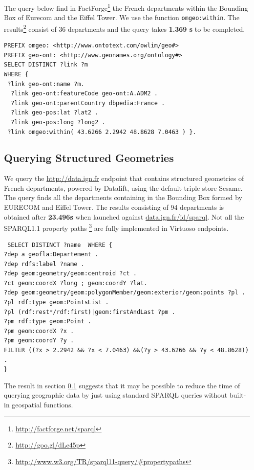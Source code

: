 The query below find in FactForge\footnote{\url{http://factforge.net/sparql}} the French departments within the Bounding Box of Eurecom and the Eiffel Tower. We use the function \texttt{omgeo:within}. The results\footnote{\url{http://goo.gl/dLc45p}} consist of 36 departments and the query takes \textbf{1.369 s} to be completed.
\begin{verbatim}
PREFIX omgeo: <http://www.ontotext.com/owlim/geo#>
PREFIX geo-ont: <http://www.geonames.org/ontology#>
SELECT DISTINCT ?link ?m
WHERE {
 ?link geo-ont:name ?m.
  ?link geo-ont:featureCode geo-ont:A.ADM2 .
  ?link geo-ont:parentCountry dbpedia:France .
  ?link geo-pos:lat ?lat2 .
  ?link geo-pos:long ?long2 .
 ?link omgeo:within( 43.6266 2.2942 48.8628 7.0463 ) }.

\end{verbatim}


\subsection{Querying Structured Geometries}
\label{sec:ignsparql}
 We query the \url{http://data.ign.fr} endpoint that contains structured geometries of French departments, powered by Datalift, using the default triple store Sesame. The query finds all the departments containing in the Bounding Box formed by EURECOM and Eiffel Tower. The results consisting of 94 departments is obtained after \textbf{23.496s} when launched against \url{data.ign.fr/id/sparql}. Not all the SPARQL1.1 property paths \footnote{\url{http://www.w3.org/TR/sparql11-query/\#propertypaths}} are fully implemented in Virtuoso endpoints.


 \begin{verbatim}
 SELECT DISTINCT ?name  WHERE {
?dep a geofla:Departement .
?dep rdfs:label ?name .
?dep geom:geometry/geom:centroid ?ct .
?ct geom:coordX ?long ; geom:coordY ?lat.
?dep geom:geometry/geom:polygonMember/geom:exterior/geom:points ?pl .
?pl rdf:type geom:PointsList .
?pl (rdf:rest*/rdf:first)|geom:firstAndLast ?pm .
?pm rdf:type geom:Point .
?pm geom:coordX ?x .
?pm geom:coordY ?y .
FILTER ((?x > 2.2942 && ?x < 7.0463) &&(?y > 43.6266 && ?y < 48.8628)) .
}
 \end{verbatim}


The result in section \ref{sec:ignsparql} suggests that it may be possible to reduce the time of querying geographic data by just using standard SPARQL queries without  built-in geospatial functions.

